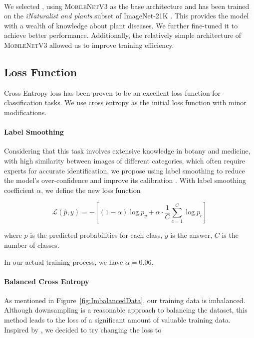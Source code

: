 \paragraph{\CROP} We selected \CROP, using \textsc{MobileNetV3} \cite{howard2019searching} as the base architecture and has been trained on the \textit{iNaturalist and plants} subset of ImageNet-21K \cite{deng2009imagenet}. This provides the model with a wealth of knowledge about plant diseases. We further fine-tuned it to achieve better performance. Additionally, the relatively simple architecture of \textsc{MobileNetV3} allowed us to improve training efficiency.

\subsection{Loss Function}

Cross Entropy loss has been proven to be an excellent loss function for classification tasks. We use cross entropy as the initial loss function with minor modifications.

\paragraph{Label Smoothing} Considering that this task involves extensive knowledge in botany and medicine, with high similarity between images of different categories, which often require experts for accurate identification, we propose using label smoothing \cite{Szegedy_2016_CVPR} to reduce the model's over-confidence and improve its calibration \cite{muller2019does}. With label smoothing coefficient $\alpha$, we define the new loss function

\begin{equation}\label{eq:full_loss}
\mathcal{L}(\hat{p}, y)=-\left[(1-\alpha)\log p_y + \alpha\cdot\frac{1}{C}\sum_{c=1}^C\log p_c\right]
\end{equation}

where $\hat{p}$ is the predicted probabilities for each class, $y$ is the answer, $C$ is the number of classes.

In our actual training process, we have $\alpha=0.06$.

\paragraph{Balanced Cross Entropy}

As mentioned in Figure~\ref{fig:ImbalancedData}, our training data is imbalanced. Although downsampling is a reasonable approach to balancing the dataset, this method leads to the loss of a significant amount of valuable training data. Inspired by \cite{aurelio2019learning}, we decided to try changing the loss to

